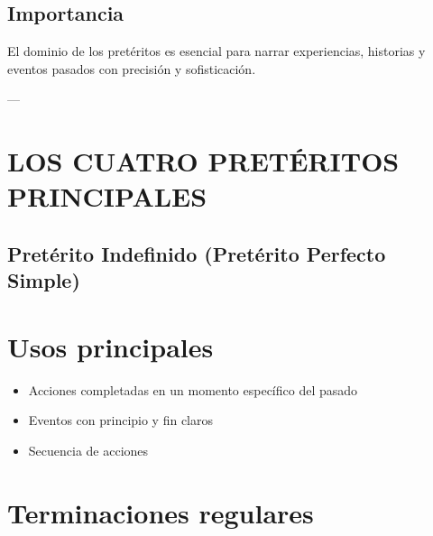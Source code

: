 \documentclass[a4paper,11pt]{article}
\begin{document}
\vspace{0.2cm}

\subsection{Importancia}

El dominio de los pretéritos es esencial para narrar experiencias, historias y eventos pasados con precisión y sofisticación.

\vspace{0.2cm}

---

\vspace{0.2cm}

\section{LOS CUATRO PRETÉRITOS PRINCIPALES}

\vspace{0.2cm}

\subsection{Pretérito Indefinido (Pretérito Perfecto Simple)}

\vspace{0.2cm}

\section{Usos principales}

\begin{itemize}

  \item Acciones completadas en un momento específico del pasado

  \item Eventos con principio y fin claros

  \item Secuencia de acciones

\end{itemize}

\vspace{0.2cm}

\section{Terminaciones regulares}

\vspace{0.2cm}
\end{document}

